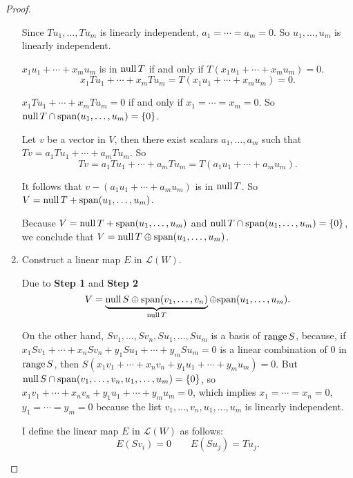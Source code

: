 \begin{proof}
\begin{enumerate}[label={\textbf{Step \arabic*.}},itemindent={1cm}]
              Since $Tu_{1}, \ldots, Tu_{m}$ is linearly independent, $a_{1} = \cdots = a_{m} = 0$. So $u_{1}, \ldots, u_{m}$ is linearly independent.

              $x_{1}u_{1} + \cdots + x_{m}u_{m}$ is in $\text{null}\,{T}$ if and only if $T(x_{1}u_{1} + \cdots + x_{m}u_{m}) = 0$.
              \[
                  x_{1}Tu_{1} + \cdots + x_{m}Tu_{m} = T(x_{1}u_{1} + \cdots + x_{m}u_{m}) = 0.
              \]

              $x_{1}Tu_{1} + \cdots + x_{m}Tu_{m} = 0$ if and only if $x_{1} = \cdots = x_{m} = 0$. So $\text{null}\,{T}\cap\text{span}(u_{1}, \ldots, u_{m}) = \{0\}$.

              Let $v$ be a vector in $V$, then there exist scalars $a_{1}, \ldots, a_{m}$ such that $Tv = a_{1}Tu_{1} + \cdots + a_{m}Tu_{m}$. So
              \[
                  Tv = a_{1}Tu_{1} + \cdots + a_{m}Tu_{m} = T(a_{1}u_{1} + \cdots + a_{m}u_{m}).
              \]

              It follows that $v - (a_{1}u_{1} + \cdots + a_{m}u_{m})$ is in $\text{null}\,{T}$. So $V = \text{null}\,{T} + \text{span}(u_{1}, \ldots, u_{m})$.

              Because $V = \text{null}\,{T} + \text{span}(u_{1}, \ldots, u_{m})$ and $\text{null}\,{T}\cap \text{span}(u_{1}, \ldots, u_{m}) = \{0\}$, we conclude that $V = \text{null}\,{T}\oplus \text{span}(u_{1}, \ldots, u_{m})$.
        \item Construct a linear map $E$ in $\mathcal{L}(W)$.

              Due to \textbf{Step 1} and \textbf{Step 2}
              \[
                  V = \underbrace{\text{null}\,{S} \oplus \text{span}(v_{1}, \ldots, v_{n})}_{\text{null}\,{T}} \oplus \text{span}(u_{1}, \ldots, u_{m}).
              \]

              On the other hand, $Sv_{1}, \ldots, Sv_{n}, Su_{1}, \ldots, Su_{m}$ is a basis of $\text{range}\,{S}$, because, if $x_{1}Sv_{1} + \cdots + x_{n}Sv_{n} + y_{1}Su_{1} + \cdots + y_{m}Su_{m} = 0$ is a linear combination of $0$ in $\text{range}\,{S}$, then $S(x_{1}v_{1} + \cdots + x_{n}v_{n} + y_{1}u_{1} + \cdots + y_{m}u_{m}) = 0$. But $\text{null}\,{S}\cap \text{span}(v_{1}, \ldots, v_{n}, u_{1}, \ldots, u_{m}) = \{0\}$, so $x_{1}v_{1} + \cdots + x_{n}v_{n} + y_{1}u_{1} + \cdots + y_{m}u_{m} = 0$, which implies $x_{1} = \cdots = x_{n} = 0$, $y_{1} = \cdots = y_{m} = 0$ because the list $v_{1}, \ldots, v_{n}, u_{1}, \ldots, u_{m}$ is linearly independent.

              I define the linear map $E$ in $\mathcal{L}(W)$ as follows:
              \[
                  E(Sv_{i}) = 0\qquad E(Su_{j}) = Tu_{j}.
              \]


\end{enumerate}
\end{proof}

